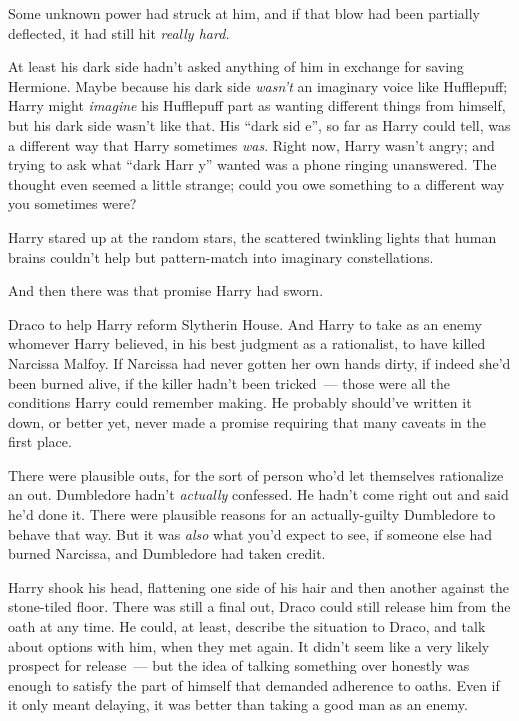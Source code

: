 Some unknown power had struck at him, and if that blow had been partially deflected, it had still hit \emph{really hard.}

At least his dark side hadn't asked anything of him in exchange for saving Hermione. Maybe because his dark side \emph{wasn't} an imaginary voice like Hufflepuff; Harry might \emph{imagine} his Hufflepuff part as wanting different things from himself, but his dark side wasn't like that. His ``dark sid e'', so far as Harry could tell, was a different way that Harry sometimes \emph{was}. Right now, Harry wasn't angry; and trying to ask what ``dark Harr y'' wanted was a phone ringing unanswered. The thought even seemed a little strange; could you owe something to a different way you sometimes were?

Harry stared up at the random stars, the scattered twinkling lights that human brains couldn't help but pattern-match into imaginary constellations.

And then there was that promise Harry had sworn.

Draco to help Harry reform Slytherin House. And Harry to take as an enemy whomever Harry believed, in his best judgment as a rationalist, to have killed Narcissa Malfoy. If Narcissa had never gotten her own hands dirty, if indeed she'd been burned alive, if the killer hadn't been tricked~--- those were all the conditions Harry could remember making. He probably should've written it down, or better yet, never made a promise requiring that many caveats in the first place.

There were plausible outs, for the sort of person who'd let themselves rationalize an out. Dumbledore hadn't \emph{actually} confessed. He hadn't come right out and said he'd done it. There were plausible reasons for an actually-guilty Dumbledore to behave that way. But it was \emph{also} what you'd expect to see, if someone else had burned Narcissa, and Dumbledore had taken credit.

Harry shook his head, flattening one side of his hair and then another against the stone-tiled floor. There was still a final out, Draco could still release him from the oath at any time. He could, at least, describe the situation to Draco, and talk about options with him, when they met again. It didn't seem like a very likely prospect for release~--- but the idea of talking something over honestly was enough to satisfy the part of himself that demanded adherence to oaths. Even if it only meant delaying, it was better than taking a good man as an enemy.

